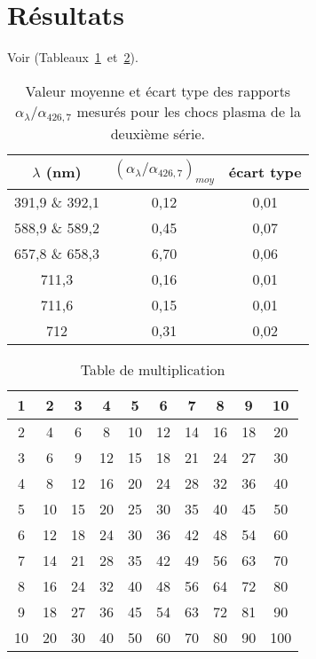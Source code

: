 \section{Résultats}
Voir (Tableaux~\ref{table:alpha}~et~\ref{table:multi}).
\lipsum[3]
\begin{table}[h!tbp]
\begin{center}
\begin{tabular}{|c | c | c |}
\hline
$\lambda$ (nm) & $(\alpha_{\lambda}/\alpha_{426,7})_{moy}$ & écart type \\
\hline
391,9 \& 392,1 & 0,12 & 0,01 \\
588,9 \& 589,2 & 0,45 & 0,07 \\
657,8 \& 658,3 & 6,70 & 0,06 \\
711,3 & 0,16 & 0,01 \\
711,6 & 0,15 & 0,01 \\
712 & 0,31 & 0,02 \\
\hline
\end{tabular}
\end{center}
\caption[Valeur moyenne et écart type des rapports $\alpha_{\lambda}/\alpha_{426,7}$]{Valeur moyenne et écart type des rapports $\alpha_{\lambda}/\alpha_{426,7}$ mesurés pour les chocs plasma de la deuxième série.}
\label{table:alpha}
\end{table}

\lipsum[2]

\begin{table}[h!tbp]
\begin{center}
\begin{tabular}{|*{10}{c|}}
    \hline
     1  & 2  & 3  & 4  & 5  & 6  & 7  & 8  & 9  & 10 \\
    \hline
     2  & 4  & 6  & 8  & 10 & 12 & 14 & 16 & 18 & 20 \\
    \hline
     3  & 6  & 9  & 12 & 15 & 18 & 21 & 24 & 27 & 30 \\
    \hline
     4  & 8  & 12 & 16 & 20 & 24 & 28 & 32 & 36 & 40 \\
    \hline
     5  & 10 & 15 & 20 & 25 & 30 & 35 & 40 & 45 & 50 \\
    \hline
     6  & 12 & 18 & 24 & 30 & 36 & 42 & 48 & 54 & 60 \\
    \hline
     7  & 14 & 21 & 28 & 35 & 42 & 49 & 56 & 63 & 70 \\
    \hline
     8  & 16 & 24 & 32 & 40 & 48 & 56 & 64 & 72 & 80 \\
    \hline
     9  & 18 & 27 & 36 & 45 & 54 & 63 & 72 & 81 & 90 \\
    \hline
     10  & 20  & 30  & 40  & 50  & 60  & 70  & 80  & 90  & 100 \\
    \hline
\end{tabular}
\end{center}
\caption{Table de multiplication}
\label{table:multi}
\end{table}

\lipsum[1]